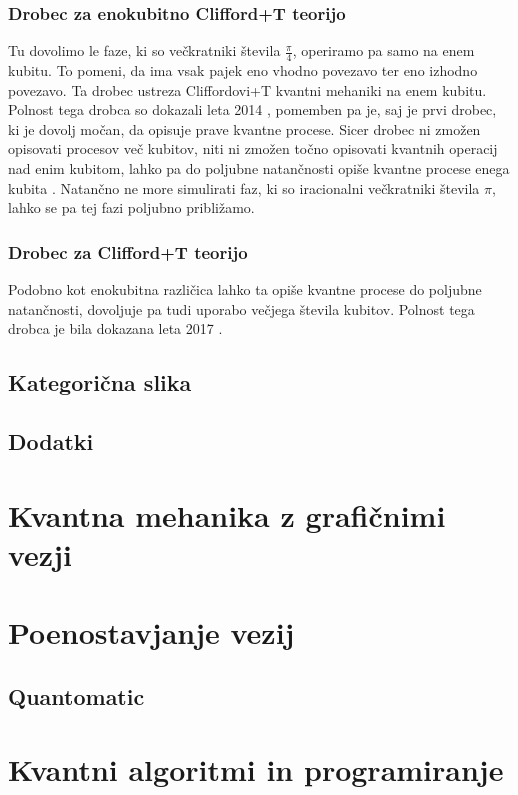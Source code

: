 \documentclass[mat1]{fmfdelo}
\begin{document}
\subsubsection{Drobec za enokubitno Clifford+T teorijo}
Tu dovolimo le faze, ki so večkratniki števila \(\frac\pi4\), operiramo pa samo na enem kubitu. To pomeni, da ima vsak pajek eno vhodno povezavo ter eno izhodno povezavo. Ta drobec ustreza Cliffordovi+T kvantni mehaniki na enem kubitu. Polnost tega drobca so dokazali leta 2014 \cite{backens2014zx}, pomemben pa je, saj je prvi drobec, ki je dovolj močan, da opisuje prave kvantne procese. Sicer drobec ni zmožen opisovati procesov več kubitov, niti ni zmožen točno opisovati kvantnih operacij nad enim kubitom, lahko pa do poljubne natančnosti opiše kvantne procese enega kubita \cite{814621}. Natančno ne more simulirati faz, ki so iracionalni večkratniki števila \(\pi\), lahko se pa tej fazi poljubno približamo.
\subsubsection{Drobec za Clifford+T teorijo}
Podobno kot enokubitna različica lahko ta opiše kvantne procese do poljubne natančnosti, dovoljuje pa tudi uporabo večjega števila kubitov. Polnost tega drobca je bila dokazana leta 2017 \cite{SimonCompleteness}.

\subsection{Kategorična slika}
\subsection{Dodatki}
\section{Kvantna mehanika z grafičnimi vezji}
\section{Poenostavjanje vezij}
\subsection{Quantomatic}
\section{Kvantni algoritmi in programiranje}
\end{document}
